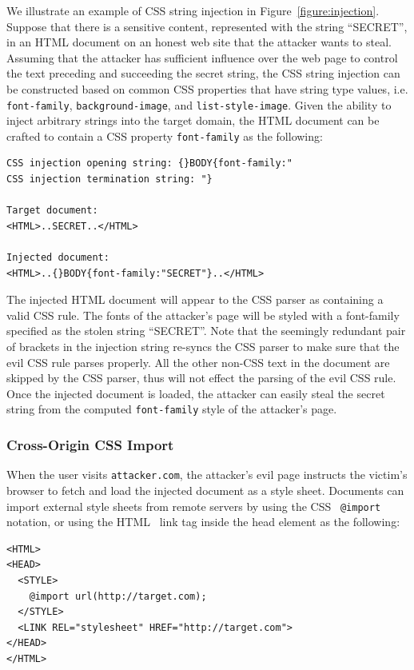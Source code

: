 \documentclass{acm_proc_article-sp}
\begin{document}
We illustrate an example of CSS string injection in Figure~\ref{figure:injection}. Suppose that there is a sensitive content, represented with the string ``SECRET'', in an HTML document on an honest web site that the attacker wants to steal. Assuming that the attacker has sufficient influence over the web page to control the text preceding and succeeding the secret string, the CSS string injection can be constructed based on common CSS properties that have string type values, i.e. \texttt{font-family}, \texttt{background-image}, and \texttt{list-style-image}. Given the ability to inject arbitrary strings into the target domain, the HTML document can be crafted to contain a CSS property \texttt{font-family} as the following:
\begin{verbatim}
CSS injection opening string: {}BODY{font-family:"
CSS injection termination string: "}

Target document:
<HTML>..SECRET..</HTML>

Injected document:
<HTML>..{}BODY{font-family:"SECRET"}..</HTML>
\end{verbatim}
The injected HTML document will appear to the CSS parser as containing a valid CSS rule. The fonts of the attacker's page will be styled with a font-family specified as the stolen string ``SECRET''. Note that the seemingly redundant pair of brackets in the injection string re-syncs the CSS parser to make sure that the evil CSS rule parses properly. All the other non-CSS text in the document are skipped by the CSS parser, thus will not effect the parsing of the evil CSS rule. Once the injected document is loaded, the attacker can easily steal the secret string from the computed \texttt{font-family} style of the attacker's page.

\subsubsection{Cross-Origin CSS Import}
When the user visits \texttt{attacker.com}, the attacker's evil page instructs the victim's browser to fetch and load the injected document as a style sheet. Documents can import external style sheets from remote servers by using the CSS~\cite{css} \texttt{@import} notation, or using the HTML~\cite{html} link tag inside the head element as the following:
\begin{verbatim}
<HTML>
<HEAD>
  <STYLE>
    @import url(http://target.com);
  </STYLE>
  <LINK REL="stylesheet" HREF="http://target.com">
</HEAD>
</HTML>
\end{verbatim}
\end{document}
